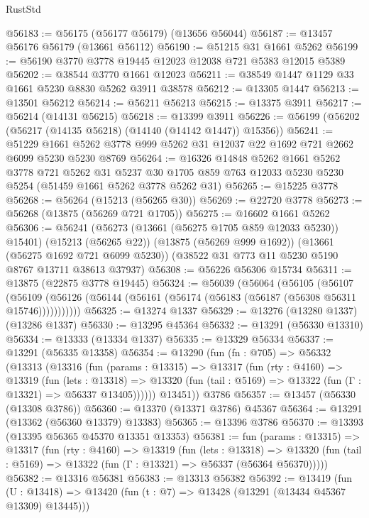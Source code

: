 \begin{lexlean}{RustStd}
\begin{coremodule}
@56183 := @56175 (@56177 @56179) (@13656 @56044)
@56187 := @13457 @56176 @56179 (@13661 @56112)
@56190 := @51215 @31 @1661 @5262
@56199 := @56190 @3770 @3778 @19445 @12023 @12038 @721 @5383 @12015 @5389
@56202 := @38544 @3770 @1661 @12023
@56211 := @38549 @1447 @1129 @33 @1661 @5230 @8830 @5262 @3911 @38578
@56212 := @13305 @1447
@56213 := @13501 @56212
@56214 := @56211 @56213
@56215 := @13375 @3911
@56217 := @56214 (@14131 @56215)
@56218 := @13399 @3911
@56226 := @56199 (@56202 (@56217 (@14135 @56218) (@14140 (@14142 @1447)) @15356))
@56241 := @51229
    @1661
    @5262
    @3778
    @999
    @5262
    @31
    @12037
    @22
    @1692
    @721
    @2662
    @6099
    @5230
    @5230
    @8769
@56264 := @16326
    @14848
    @5262
    @1661
    @5262
    @3778
    @721
    @5262
    @31
    @5237
    @30
    @1705
    @859
    @763
    @12033
    @5230
    @5230
    @5254
    (@51459 @1661 @5262 @3778 @5262 @31)
@56265 := @15225 @3778
@56268 := @56264 (@15213 (@56265 @30))
@56269 := @22720 @3778
@56273 := @56268 (@13875 (@56269 @721 @1705))
@56275 := @16602 @1661 @5262
@56306 := @56241
    (@56273 (@13661 (@56275 @1705 @859 @12033 @5230)) @15401)
    (@15213 (@56265 @22))
    (@13875 (@56269 @999 @1692))
    (@13661 (@56275 @1692 @721 @6099 @5230))
    (@38522 @31 @773 @11 @5230 @5190 @8767 @13711 @38613 @37937)
@56308 := @56226 @56306 @15734
@56311 := @13875 (@22875 @3778 @19445)
@56324 := @56039
    (@56064
      (@56105
        (@56107
          (@56109 (@56126 (@56144 (@56161 (@56174 (@56183 (@56187 (@56308 @56311 @15746)))))))))))
@56325 := @13274 @1337
@56329 := @13276 (@13280 @1337) (@13286 @1337)
@56330 := @13295 @45364
@56332 := @13291 (@56330 @13310)
@56334 := @13333 (@13334 @1337)
@56335 := @13329 @56334
@56337 := @13291 (@56335 @13358)
@56354 := @13290
    (fun (fn : @705) =>
    @56332
      (@13313
        (@13316
          (fun (params : @13315) =>
          @13317
            (fun (rty : @4160) =>
            @13319
              (fun (lets : @13318) =>
              @13320 (fun (tail : @5169) => @13322 (fun (Γ : @13321) => @56337 @13405))))))
        @13451))
    @3786
@56357 := @13457 (@56330 (@13308 @3786))
@56360 := @13370 (@13371 @3786) @45367
@56364 := @13291 (@13362 (@56360 @13379) @13383)
@56365 := @13396 @3786
@56370 := @13393 (@13395 @56365 @45370 @13351 @13353)
@56381 := fun (params : @13315) =>
  @13317
    (fun (rty : @4160) =>
    @13319
      (fun (lets : @13318) =>
      @13320 (fun (tail : @5169) => @13322 (fun (Γ : @13321) => @56337 (@56364 @56370)))))
@56382 := @13316 @56381
@56383 := @13313 @56382
@56392 := @13419
    (fun (U : @13418) => @13420 (fun (t : @7) => @13428 (@13291 (@13434 @45367 @13309) @13445)))

\end{coremodule}
\end{lexlean}
